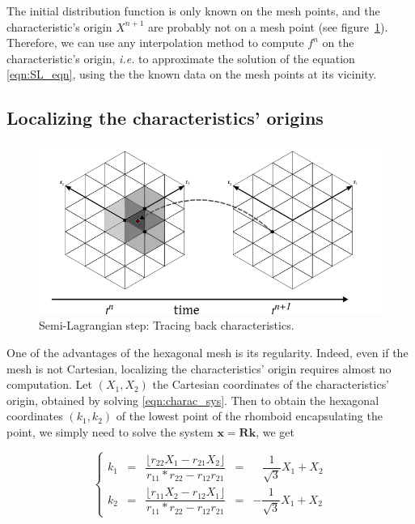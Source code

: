 \documentclass[proc]{edpsmath}
\begin{document}
The initial distribution function is only known on the mesh points, and the characteristic's origin $X^{n+1}$ are probably not on a mesh point (see figure~\ref{fig:SL_hex}). Therefore, we can use any interpolation method to compute $f^n$ on the characteristic's origin, \emph{i.e.} to approximate the solution of the equation \eqref{eqn:SL_eqn}, using the the known data on the mesh points at its vicinity.


\subsection{Localizing the characteristics' origins}


\begin{figure}[h!]
	\centering
	\includegraphics[scale=0.5]{figures/SL_hex.png} 
	\caption{Semi-Lagrangian step: Tracing back characteristics.}
	\label{fig:SL_hex}
\end{figure}


One of the advantages of the hexagonal mesh is its regularity. Indeed, even if the mesh is not Cartesian, localizing the characteristics' origin requires almost no computation. Let $(X_1, X_2)$ the Cartesian coordinates of the characteristics' origin, obtained by solving \eqref{eqn:charac_sys}. Then to obtain the hexagonal coordinates $(k_1, k_2)$ of the lowest point of the rhomboid encapsulating the point, we simply need to solve the system $\mathbf{x} = \mathbf{R} \mathbf{k}$, we get

\begin{equation}
	\label{eqn:k1k2}
	\left\lbrace
	\begin{array}{lclcl}
	k_1 &=&  \dfrac{\lfloor r_{22} X_1 - r_{21} X_2 \rfloor}{r_{11}*r_{22} - r_{12} r_{21}} & = &  \;\;\;\dfrac{1}{\sqrt{3}} X_1 + X_2\\[0.3cm]
	k_2 &=&  \dfrac{\lfloor r_{11} X_2 - r_{12} X_1 \rfloor}{r_{11}*r_{22} - r_{12} r_{21}} & = &  -\dfrac{1}{\sqrt{3}} X_1 + X_2
	\end{array}\right.
\end{equation}
\end{document}
